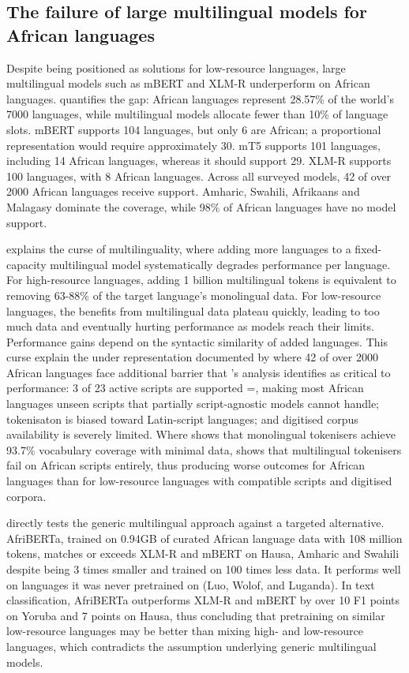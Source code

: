 \documentclass[12pt]{ThesisRU}
\begin{document}
\subsection{The failure of large multilingual models for African languages}

Despite being positioned as solutions for low-resource languages, large multilingual models such as mBERT and XLM-R underperform on African languages. \citet{hussen2025state} quantifies the gap: African languages represent 28.57\% of the world's 7000 languages, while multilingual models allocate fewer than 10\% of language slots. mBERT supports 104 languages, but only 6 are African; a proportional representation would require approximately 30. mT5 supports 101 languages, including 14 African languages, whereas it should support 29. XLM-R supports 100 languages, with 8 African languages. Across all surveyed models, 42 of over 2000 African languages receive support. Amharic, Swahili, Afrikaans and Malagasy dominate the coverage, while 98\% of African languages have no model support.

\citet{chang2024multilinguality} explains the curse of multilinguality, where adding more languages to a fixed-capacity multilingual model systematically degrades performance per language. For high-resource languages, adding 1 billion multilingual tokens is equivalent to removing 63-88\% of the target language's monolingual data. For low-resource languages, the benefits from multilingual data plateau quickly, leading to too much data and eventually hurting performance as models reach their limits. Performance gains depend on the syntactic similarity of added languages. This curse explain the under representation documented by \citet{hussen2025state} where 42 of over 2000 African languages face additional barrier that \citet{chang2024multilinguality}'s analysis identifies as critical to performance: 3 of 23 active scripts are supported =, making most African languages unseen scripts that partially script-agnostic models cannot handle; tokenisaton is biased toward Latin-script languages; and digitised corpus availability is severely limited. Where \citet{chang2024multilinguality} shows that monolingual tokenisers achieve 93.7\% vocabulary coverage with minimal data, \citet{hussen2025state} shows that multilingual tokenisers fail on African scripts entirely, thus producing worse outcomes for African languages than for low-resource languages with compatible scripts and digitised corpora.

\citet{ogueji2022afriberta} directly tests the generic multilingual approach against a targeted alternative. AfriBERTa, trained on 0.94GB of curated African language data with 108 million tokens, matches or exceeds XLM-R and mBERT on Hausa, Amharic and Swahili despite being 3 times smaller and trained on 100 times less data. It performs well on languages it was never pretrained on (Luo, Wolof, and Luganda). In text classification, AfriBERTa outperforms XLM-R and mBERT by over 10 F1 points on Yoruba and 7 points on Hausa, thus concluding that pretraining on similar low-resource languages may be better than mixing high- and low-resource languages, which contradicts the assumption underlying generic multilingual models.
\end{document}
